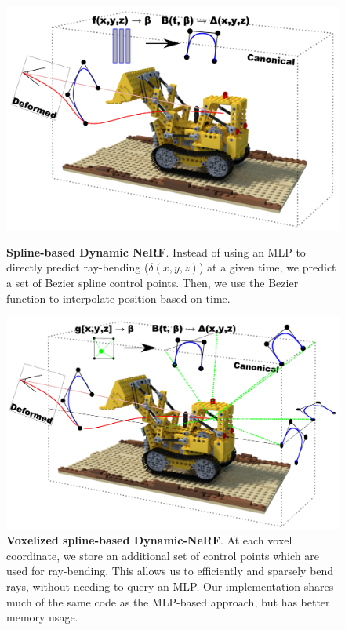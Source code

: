 \begin{figure}
    \centering
    \begin{minipage}[b]{0.45\textwidth}
    \centering
    \includegraphics[width=\textwidth]{spline_nerf_diagram.png}
    \caption{
        \textbf{Spline-based Dynamic NeRF}. Instead of using an MLP to directly predict ray-bending ($\delta(x,y,z)$)  at a given time, we predict a set of Bezier spline control points. Then, we use the Bezier function to interpolate position based on time.
    }
    \label{fig:arch_diagram}
    \end{minipage}\hfill
    \begin{minipage}[b]{0.45\textwidth}
    \centering
    \includegraphics[width=\textwidth]{c0_paper/voxel_spline.png}
    \caption{
        \label{fig:voxel_diagram}
        \textbf{Voxelized spline-based Dynamic-NeRF}. At each voxel coordinate, we store an additional set of control points which are used for ray-bending. This allows us to efficiently and sparsely bend rays, without needing to query an MLP. Our implementation shares much of the same code as the MLP-based approach, but has better memory usage.
    }
    \end{minipage}
\end{figure}
